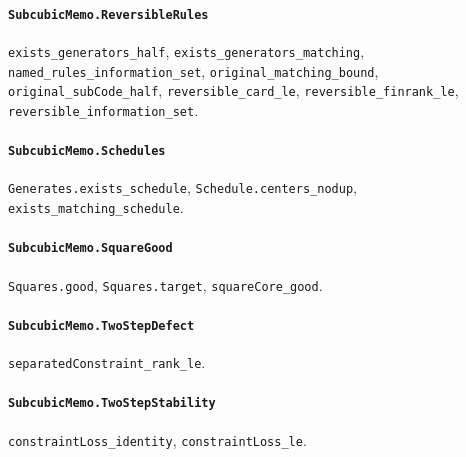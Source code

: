 \paragraph{\texttt{SubcubicMemo.ReversibleRules}}
{\small\raggedright \texttt{exists\_generators\_half}, \texttt{exists\_generators\_matching}, \texttt{named\_rules\_information\_set}, \texttt{original\_matching\_bound}, \texttt{original\_subCode\_half}, \texttt{reversible\_card\_le}, \texttt{reversible\_finrank\_le}, \texttt{reversible\_information\_set}.\par}

\paragraph{\texttt{SubcubicMemo.Schedules}}
{\small\raggedright \texttt{Generates.exists\_schedule}, \texttt{Schedule.centers\_nodup}, \texttt{exists\_matching\_schedule}.\par}

\paragraph{\texttt{SubcubicMemo.SquareGood}}
{\small\raggedright \texttt{Squares.good}, \texttt{Squares.target}, \texttt{squareCore\_good}.\par}

\paragraph{\texttt{SubcubicMemo.TwoStepDefect}}
{\small\raggedright \texttt{separatedConstraint\_rank\_le}.\par}

\paragraph{\texttt{SubcubicMemo.TwoStepStability}}
{\small\raggedright \texttt{constraintLoss\_identity}, \texttt{constraintLoss\_le}.\par}
